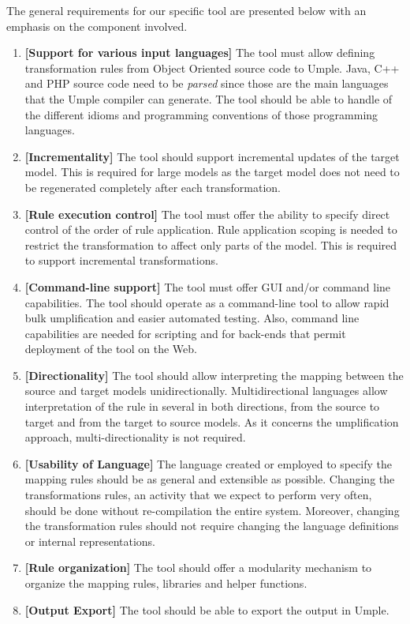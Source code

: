 The general requirements for our specific tool are presented below with an emphasis on the component involved.

\begin{enumerate}
\item \textbf{[Support for various input languages]} The tool must allow defining transformation rules from Object Oriented source code to Umple. Java, C++ and PHP source code need to be \textit{parsed} since those are the main languages that the Umple compiler can generate. The tool should be able to handle of  the different idioms and programming conventions of those programming languages.

\item \textbf{[Incrementality]} The tool should support incremental updates of the target model. This is required for large models as the target model does not need to be regenerated completely after each transformation. 

\item \textbf{[Rule execution control]} The tool must offer the ability to specify direct control of the order of rule application. Rule application scoping is needed to restrict the transformation to affect only parts of the model. This is required to support incremental transformations.

\item \textbf{[Command-line support]} The tool must offer GUI and/or command line capabilities. The tool should operate as a command-line tool to allow rapid bulk umplification and easier automated testing. Also, command line capabilities are needed for scripting and for back-ends that permit deployment of the tool on the Web. 

\item \textbf{[Directionality]} The tool should allow interpreting the mapping between the source and target models unidirectionally. Multidirectional languages allow interpretation of the rule in several in both directions, from the source to target and from the target to source models. As it concerns the umplification approach, multi-directionality is not required. 

\item \textbf{[Usability of Language]} The language created or employed to specify the mapping rules should be as general and extensible as possible. Changing the transformations rules, an activity that we expect to perform very often, should be done without re-compilation the entire system. Moreover, changing the transformation rules should not require changing the language definitions or internal representations.
 
\item \textbf{[Rule organization]} The tool should offer a modularity mechanism to organize the mapping rules, libraries and helper functions. 

\item \textbf{[Output Export]} The tool should be able to export the output in Umple. 
\end{enumerate}

